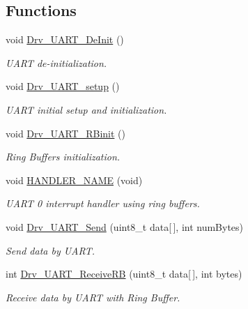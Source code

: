 \subsection*{Functions}
\begin{DoxyCompactItemize}
\item 
void \hyperlink{group___u_a_r_t___library_ga4d7777f8692bb7fdf17e975025bfbf8a}{Drv\+\_\+\+U\+A\+R\+T\+\_\+\+De\+Init} ()
\begin{DoxyCompactList}\small\item\em U\+A\+R\+T de-\/initialization. \end{DoxyCompactList}\item 
void \hyperlink{group___u_a_r_t___library_ga8026f78d22425b39818431d299d638a3}{Drv\+\_\+\+U\+A\+R\+T\+\_\+setup} ()
\begin{DoxyCompactList}\small\item\em U\+A\+R\+T initial setup and initialization. \end{DoxyCompactList}\item 
void \hyperlink{group___u_a_r_t___library_gae34ea7abfefbe2834e8b17aec557a30d}{Drv\+\_\+\+U\+A\+R\+T\+\_\+\+R\+Binit} ()
\begin{DoxyCompactList}\small\item\em Ring Buffers initialization. \end{DoxyCompactList}\item 
void \hyperlink{group___u_a_r_t___library_gab1ae01fa9bacc6e16c6aff7f1e055b1d}{H\+A\+N\+D\+L\+E\+R\+\_\+\+N\+A\+M\+E} (void)
\begin{DoxyCompactList}\small\item\em U\+A\+R\+T 0 interrupt handler using ring buffers. \end{DoxyCompactList}\item 
void \hyperlink{group___u_a_r_t___library_ga3cd9c151bd9649652b8f6c7a8a371f4b}{Drv\+\_\+\+U\+A\+R\+T\+\_\+\+Send} (uint8\+\_\+t data\mbox{[}$\,$\mbox{]}, int num\+Bytes)
\begin{DoxyCompactList}\small\item\em Send data by U\+A\+R\+T. \end{DoxyCompactList}\item 
int \hyperlink{group___u_a_r_t___library_gac8130d4c4c932205906c516ff6afe684}{Drv\+\_\+\+U\+A\+R\+T\+\_\+\+Receive\+R\+B} (uint8\+\_\+t data\mbox{[}$\,$\mbox{]}, int bytes)
\begin{DoxyCompactList}\small\item\em Receive data by U\+A\+R\+T with Ring Buffer. \end{DoxyCompactList}\item 

\end{DoxyCompactItemize}
